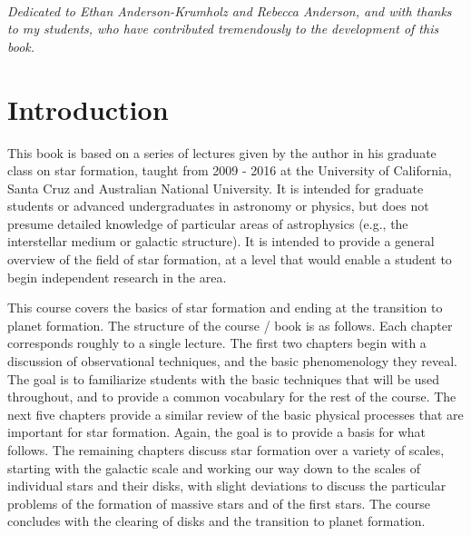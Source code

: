 \documentclass[twoside]{tex/tufte-book} %
\begin{document}


\cleardoublepage
~\vfill
\begin{doublespace}
\noindent\fontsize{18}{22}\selectfont\itshape
\nohyphenation
Dedicated to Ethan Anderson-Krumholz and Rebecca Anderson, and with thanks to my students, who have contributed tremendously to the development of this book.
\end{doublespace}
\vfill
\vfill


\cleardoublepage
\chapter*{Introduction} %

This book is based on a series of lectures given by the author in his graduate class on star formation, taught from 2009 - 2016 at the University of California, Santa Cruz and Australian National University. It is intended for graduate students or advanced undergraduates in astronomy or physics, but does not presume detailed knowledge of particular areas of astrophysics (e.g., the interstellar medium or galactic structure). It is intended to provide a general overview of the field of star formation, at a level that would enable a student to begin independent research in the area.

This course covers the basics of star formation and ending at the transition to planet formation. The structure of the course / book is as follows. Each chapter corresponds roughly to a single lecture. The first two chapters begin with a discussion of observational techniques, and the basic phenomenology they reveal. The goal is to familiarize students with the basic techniques that will be used throughout, and to provide a common vocabulary for the rest of the course. The next five chapters provide a similar review of the basic physical processes that are important for star formation. Again, the goal is to provide a basis for what follows. The remaining chapters discuss star formation over a variety of scales, starting with the galactic scale and working our way down to the scales of individual stars and their disks, with slight deviations to discuss the particular problems of the formation of massive stars and of the first stars. The course concludes with the clearing of disks and the transition to planet formation.
\end{document}
